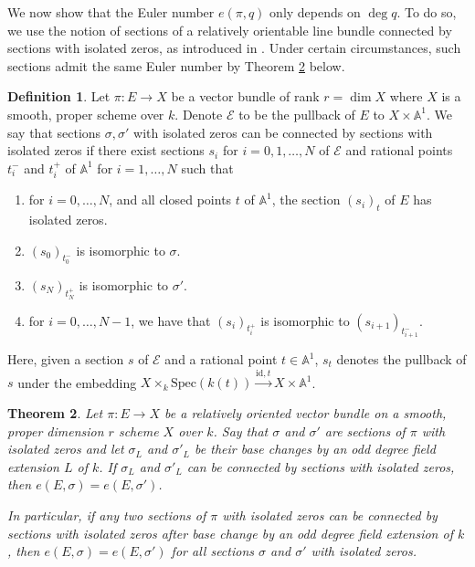 \documentclass[12pt, reqno]{amsart}
\newtheorem{theorem}{Theorem}[section]
\theoremstyle{definition}
\newtheorem{definition}[theorem]{Definition}
\newcommand{\Spec}{\mathrm{Spec }} %
\newcommand{\A}{\mathbb{A}} %
\begin{document}



We now show that the Euler number $e(\pi,q)$ only depends on $\deg q$. To do so, we use the notion of sections of a relatively orientable line bundle connected by sections with isolated zeros, as introduced in \cite[Definition 37]{kwcubic}. Under certain circumstances, such sections admit the same Euler number by Theorem \ref{thm:eulernumberconnectedsection} below.

\begin{definition} \label{def:sectionsconnected}
Let $\pi: E \rightarrow X$ be a vector bundle of rank $r = \dim X$ where $X$ is a smooth, proper scheme over $k$. Denote $\mathcal{E}$ to be the pullback of $E$ to $X \times \mathbb{A}^1$. We say that sections $\sigma,\sigma'$ with isolated zeros can be connected by sections with isolated zeros if there exist sections $s_i$ for $i = 0,1,\ldots,N$ of $\mathcal{E}$ and rational points $t_i^-$ and $t_i^+$ of $\A^1$ for $i = 1,\ldots, N$ such that
\begin{enumerate}[(1)]
	\item for $i = 0,\ldots, N$, and all closed points $t$ of $\A^1$, the section $(s_i)_t$ of $E$ has isolated zeros.
	\item $(s_0)_{t_0^-}$ is isomorphic to $\sigma$. 
	\item $(s_N)_{t_N^+}$ is isomorphic to $\sigma'$.
	\item for $i = 0,\ldots,N-1$, we have that $(s_i)_{t_i^+}$ is isomorphic to $(s_{i+1})_{t_{i+1}^-}$. 
\end{enumerate}
Here, given a section $s$ of $\mathcal{E}$ and a rational point $t \in \A^1$, $s_t$ denotes the pullback of $s$ under the embedding $X  \times_k \Spec(k(t)) \xrightarrow{\text{id},t} X \times \mathbb{A}^1$.
\end{definition}

\begin{theorem}{\cite[Corollary 38]{kwcubic}} \label{thm:eulernumberconnectedsection}
Let $\pi: E \rightarrow X$ be a relatively oriented vector bundle on a smooth, proper dimension $r$ scheme $X$ over $k$. Say that $\sigma$ and $\sigma'$ are sections of $\pi$ with isolated zeros and let $\sigma_L$ and $\sigma'_L$ be their base changes by an odd degree field extension $L$ of $k$. If $\sigma_L$ and $\sigma'_L$ can be connected by sections with isolated zeros, then $e(E,\sigma) = e(E,\sigma')$. \par
In particular, if any two sections of $\pi$ with isolated zeros can be connected by sections with isolated zeros after base change by an odd degree field extension of $k$, then $e(E,\sigma) = e(E,\sigma')$ for all sections $\sigma$ and $\sigma'$ with isolated zeros.  
\end{theorem}
\end{document}
